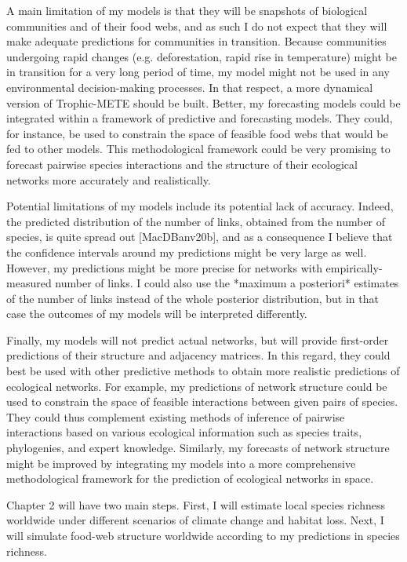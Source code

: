 A main limitation of my models is that they will be snapshots of biological
communities and of their food webs, and as such I do not expect that they will
make adequate predictions for communities in transition. Because communities
undergoing rapid changes (e.g. deforestation, rapid rise in temperature) might
be in transition for a very long period of time, my model might not be used in
any environmental decision-making processes. In that respect, a more dynamical
version of Trophic-METE should be built. Better, my forecasting models could be
integrated within a framework of predictive and forecasting models. They could,
for instance, be used to constrain the space of feasible food webs that would be
fed to other models. This methodological framework could be very promising to
forecast pairwise species interactions and the structure of their ecological
networks more accurately and realistically.

Potential limitations of my models include its potential lack of accuracy.
Indeed, the predicted distribution of the number of links, obtained from the
number of species, is quite spread out [MacDBanv20b], and as a consequence I
believe that the confidence intervals around my predictions might be very large
as well. However, my predictions might be more precise for networks with
empirically-measured number of links. I could also use the *maximum a
posteriori* estimates of the number of links instead of the whole posterior
distribution, but in that case the outcomes of my models will be interpreted
differently.

Finally, my models will not predict actual networks, but will provide
first-order predictions of their structure and adjacency matrices. In this
regard, they could best be used with other predictive methods to obtain more
realistic predictions of ecological networks. For example, my predictions of
network structure could be used to constrain the space of feasible interactions
between given pairs of species. They could thus complement existing methods of
inference of pairwise interactions based on various ecological information such
as species traits, phylogenies, and expert knowledge. Similarly, my forecasts of
network structure might be improved by integrating my models into a more
comprehensive methodological framework for the prediction of ecological networks
in space.

Chapter 2 will have two main steps. First, I will estimate local
species richness worldwide under different scenarios of climate change and
habitat loss. Next, I will simulate food-web structure worldwide according to my
predictions in species richness.

